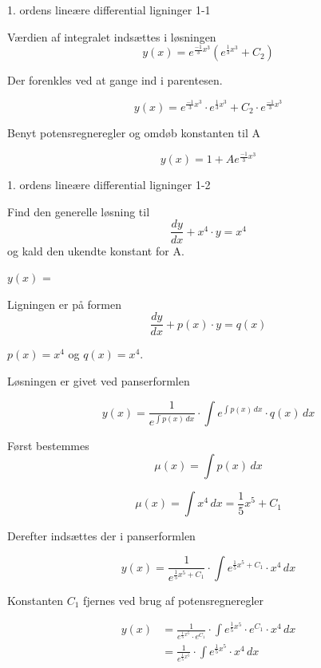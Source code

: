 \documentclass{article}
\begin{document}
\begin{exercise}{1. ordens lineære differential ligninger 1-1}
\hint

Værdien af integralet indsættes i løsningen
\[
y(x) = e^{\frac{-1}{3}x^3} \left( e^{\frac{1}{3}x^3}+ C_2\right)
\]

\hint

Der forenkles ved at gange ind i parentesen.

\hint
\[
y(x) = e^{\frac{-1}{3}x^3} \cdot e^{\frac{1}{3}x^3} + C_2 \cdot e^{\frac{-1}{3}x^3} 
\]

\hint

Benyt potensregneregler og omdøb konstanten til A

\hint
\[
y(x) = 1 + A e^{\frac{-1}{3}x^3}
\]


\end{exercise}

\newpage

\begin{exercise}{1. ordens lineære differential ligninger 1-2}
	
	
	Find den generelle løsning til
	\[
	\frac{dy}{dx} + x^4 \cdot y = x^4
	\]
	og kald den ukendte konstant for A.
	
	$y(x)$ =  
	
	
	
	\hint
	
	Ligningen er på formen
	\[
	\frac{dy}{dx} + p(x) \cdot y = q(x)
	\]
	
	\hint
	
	$p(x)=x^4$ og $q(x)=x^4$.
	
	\hint
	
	Løsningen er givet ved panserformlen
	
	
	\hint
	
	\[
	y(x) = \frac{1}{e^{\int p(x) \, dx}} \cdot \int e^{\int p(x) \, dx}  \cdot q(x) \, dx
	\]
	
	\hint
	
	Først bestemmes 
	\[
	\mu(x) = \int p(x) \, dx
	\]
	
	\hint
	\[
	\mu(x) = \int x^4 \, dx = \frac{1}{5} x^5 + C_1
	\]
	
	\hint
	Derefter indsættes der i  panserformlen
	
	\hint
	
	\[
	y(x) = \frac{1}{e^{\frac{1}{5}x^5 + C_1}} \cdot \int e^{\frac{1}{5}x^5 + C_1}  \cdot x^4 \, dx
	\]
	
	
	\hint
	
	Konstanten $C_1$ fjernes ved brug af potensregneregler
	
	\hint
	\begin{align*}
	y(x) &= \frac{1}{e^{\frac{1}{5}x^5} \cdot e^{C_1}} \cdot \int e^{\frac{1}{5}x^5} \cdot e^{C_1}  \cdot x^4 \, dx  \\
	&= \frac{1}{e^{\frac{1}{5}x^5}} \cdot \int e^{\frac{1}{5}x^5}  \cdot x^4 \, dx
	\end{align*}
	

\end{exercise}
\end{document}
